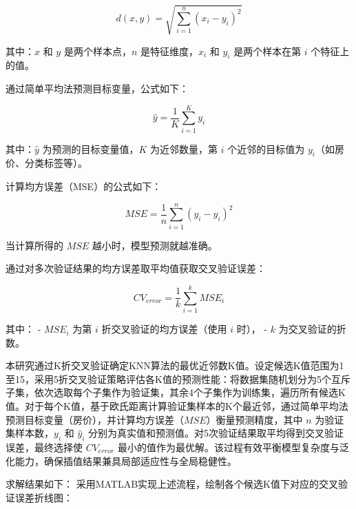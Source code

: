 \documentclass[12pt]{article}
\begin{document}
\begin{CJK}{UTF8}{gbsn}
\begin{enumerate}
		\begin{equation}
			d(x, y) = \sqrt{\sum_{i=1}^{n} (x_i - y_i)^2}
		\end{equation}
		
		其中：\( x \) 和 \( y \) 是两个样本点，\( n \) 是特征维度，\( x_i \) 和 \( y_i \) 是两个样本在第 \( i \) 个特征上的值。
		
		通过简单平均法预测目标变量，公式如下：
		
		\begin{equation}
			\hat{y} = \frac{1}{K} \sum_{i=1}^{K} y_i
		\end{equation}
		
		其中：\( \hat{y} \) 为预测的目标变量值，\( K \) 为近邻数量，第 \( i \) 个近邻的目标值为 \( y_i \)（如房价、分类标签等）。
		
		计算均方误差（MSE）的公式如下：
		
		\begin{equation}
			MSE = \frac{1}{n} \sum_{i=1}^{n} (y_i - \hat{y}_i)^2
		\end{equation}
		
		当计算所得的 \( MSE \) 越小时，模型预测就越准确。
		
		通过对多次验证结果的均方误差取平均值获取交叉验证误差：
		
		\begin{equation}
			CV_{error} = \frac{1}{k} \sum_{i=1}^{k} MSE_i
		\end{equation}
		
		其中：
		- \( MSE_i \) 为第 \( i \) 折交叉验证的均方误差（使用 \( i \) 时），
		- \( k \) 为交叉验证的折数。
		
		本研究通过K折交叉验证确定KNN算法的最优近邻数K值。设定候选K值范围为1至15，采用5折交叉验证策略评估各K值的预测性能：将数据集随机划分为5个互斥子集，依次选取每个子集作为验证集，其余4个子集作为训练集，遍历所有候选K值。对于每个K值，基于欧氏距离计算验证集样本的K个最近邻，通过简单平均法预测目标变量（房价），并计算均方误差（\( MSE \)）衡量预测精度，其中 \( n \) 为验证集样本数，\( y_i \) 和 \( \hat{y}_i \) 分别为真实值和预测值。对5次验证结果取平均得到交叉验证误差，最终选择使 \( CV_{error} \) 最小的值作为最优解。该过程有效平衡模型复杂度与泛化能力，确保插值结果兼具局部适应性与全局稳健性。
		
		求解结果如下：
		采用MATLAB实现上述流程，绘制各个候选K值下对应的交叉验证误差折线图：
	\end{enumerate}
	

\end{CJK}
\end{document}

